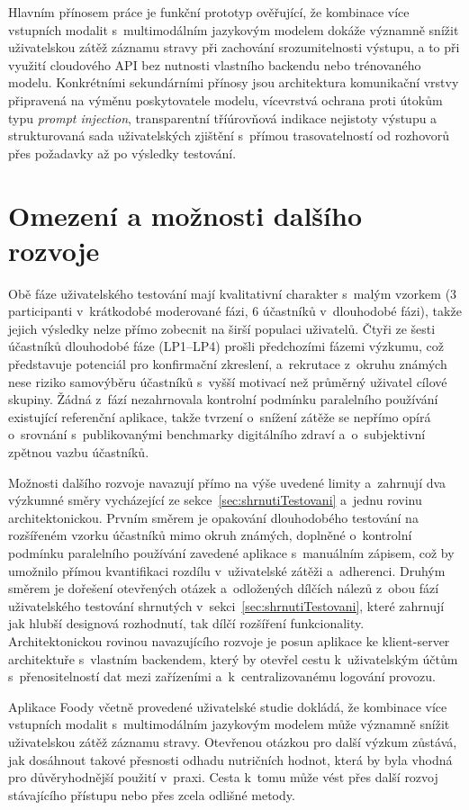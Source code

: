 Hlavním přínosem práce je funkční prototyp ověřující, že kombinace více vstupních modalit s~multimodálním jazykovým modelem dokáže významně snížit uživatelskou zátěž záznamu stravy při zachování srozumitelnosti výstupu, a to při využití cloudového API bez nutnosti vlastního backendu nebo trénovaného modelu.
Konkrétními sekundárními přínosy jsou architektura komunikační vrstvy připravená na výměnu poskytovatele modelu, vícevrstvá ochrana proti útokům typu \emph{prompt injection}, transparentní tříúrovňová indikace nejistoty výstupu a strukturovaná sada uživatelských zjištění s~přímou trasovatelností od rozhovorů přes požadavky až po výsledky testování.

\section*{Omezení a možnosti dalšího rozvoje}

Obě fáze uživatelského testování mají kvalitativní charakter s~malým vzorkem (3 participanti v~krátkodobé moderované fázi, 6 účastníků v~dlouhodobé fázi), takže jejich výsledky nelze přímo zobecnit na širší populaci uživatelů.
Čtyři ze šesti účastníků dlouhodobé fáze (LP1--LP4) prošli předchozími fázemi výzkumu, což představuje potenciál pro konfirmační zkreslení, a~rekrutace z~okruhu známých nese riziko samovýběru účastníků s~vyšší motivací než průměrný uživatel cílové skupiny.
Žádná z~fází nezahrnovala kontrolní podmínku paralelního používání existující referenční aplikace, takže tvrzení o~snížení zátěže se nepřímo opírá o~srovnání s~publikovanými benchmarky digitálního zdraví a~o~subjektivní zpětnou vazbu účastníků.

Možnosti dalšího rozvoje navazují přímo na výše uvedené limity a~zahrnují dva výzkumné směry vycházející ze sekce~\ref{sec:shrnutiTestovani} a~jednu rovinu architektonickou.
Prvním směrem je opakování dlouhodobého testování na rozšířeném vzorku účastníků mimo okruh známých, doplněné o~kontrolní podmínku paralelního používání zavedené aplikace s~manuálním zápisem, což by umožnilo přímou kvantifikaci rozdílu v~uživatelské zátěži a~adherenci.
Druhým směrem je dořešení otevřených otázek a~odložených dílčích nálezů z~obou fází uživatelského testování shrnutých v~sekci~\ref{sec:shrnutiTestovani}, které zahrnují jak hlubší designová rozhodnutí, tak dílčí rozšíření funkcionality.
Architektonickou rovinou navazujícího rozvoje je posun aplikace ke klient-server architektuře s~vlastním backendem, který by otevřel cestu k~uživatelským účtům s~přenositelností dat mezi zařízeními a~k~centralizovanému logování provozu.

Aplikace Foody včetně provedené uživatelské studie dokládá, že kombinace více vstupních modalit s~multimodálním jazykovým modelem může významně snížit uživatelskou zátěž záznamu stravy.
Otevřenou otázkou pro další výzkum zůstává, jak dosáhnout takové přesnosti odhadu nutričních hodnot, která by byla vhodná pro důvěryhodnější použití v~praxi.
Cesta k~tomu může vést přes další rozvoj stávajícího přístupu nebo přes zcela odlišné metody.
